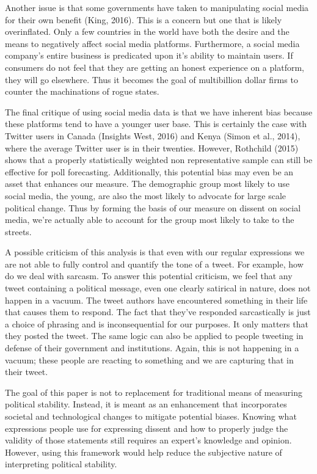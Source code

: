 \documentclass[12pt]{article}
\begin{document}
\begin{spacing}{1.5}
Another issue is that some governments have taken to manipulating social media for their own benefit (King, 2016). This is a concern but one that is likely overinflated. Only a few countries in the world have both the desire and the means to negatively affect social media platforms. Furthermore, a social media company's entire business is predicated upon it's ability to maintain users. If consumers do not feel that they are getting an honest experience on a platform, they will go elsewhere. Thus it becomes the goal of multibillion dollar firms to counter the machinations of rogue states. 

The final critique of using social media data is that we have inherent bias because these platforms tend to have a younger user base. This is certainly the case with Twitter users in Canada (Insights West, 2016) and Kenya (Simon et al., 2014), where the average Twitter user is in their twenties. However, Rothchild (2015) shows that a properly statistically weighted non representative sample can still be effective for poll forecasting. Additionally, this potential bias may even be an asset that enhances our measure. The demographic group most likely to use social media, the young, are also the most likely to advocate for large scale political change. Thus by forming the basis of our measure on dissent on social media, we're actually able to account for the group most likely to take to the streets.



A possible criticism of this analysis is that even with our regular expressions we are not able to fully control and quantify the tone of a tweet. For example, how do we deal with sarcasm. To answer this potential criticism, we feel that any tweet containing a political message, even one clearly satirical in nature, does not happen in a vacuum. The tweet authors have encountered something in their life that causes them to respond. The fact that they've responded sarcastically is just a choice of phrasing and is inconsequential for our purposes. It only matters that they posted the tweet. The same logic can also be applied to people tweeting in defense of their government and institutions. Again, this is not happening in a vacuum; these people are reacting to something and we are capturing that in their tweet.   


The goal of this paper is not to replacement for traditional means of measuring political stability. Instead, it is meant as an enhancement that incorporates societal and technological changes to mitigate potential biases. Knowing what expressions people use for expressing dissent and how to properly judge the validity of those statements still requires an expert's knowledge and opinion. However, using this framework would help reduce the subjective nature of interpreting political stability. 


\end{spacing}

\pagebreak




\nocite{*}
\end{document}
